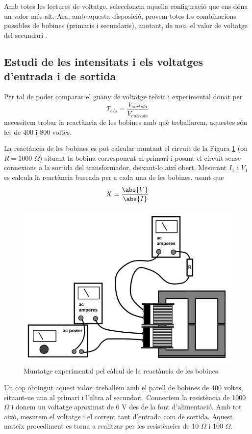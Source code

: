 \documentclass[a4paper,10.5pt]{report}
\begin{document}
Amb totes les lectures de voltatge, seleccionem aquella configuració que ens dóna un valor més alt. Ara, amb aquesta disposició, provem totes les combinacions possibles de bobines (primaris i secundaris), anotant, de nou, el valor de voltatge del secundari .

\subsection{Estudi de les intensitats i els voltatges d'entrada i de sortida}
Per tal de poder comparar el guany de voltatge teòric i experimental donat per
\begin{equation}
	T_{e/s}=\frac{V_{sortida}}{V_{entrada}}
	\label{eq4:25}
\end{equation}
necessitem trobar la reactància de les bobines amb què treballarem, aquestes són les de 400 i 800 voltes.

La reactància de les bobines es pot calcular muntant el circuit de la Figura \ref{fig4:4} (on $R=1000$ $\Omega$) situant la bobina corresponent al primari i posant el circuit sense connexions a la sortida del transformador, deixant-lo així obert. Mesurant $I_1$ i $V_1$ es calcula la reactància buscada per a cada una de les bobines, usant que
\begin{equation}
	X = \frac{\abs{V}}{\abs{I}}
	\label{eq4:27}
\end{equation}

\begin{figure}[h]
	\centering
	\includegraphics[width=0.4\linewidth]{screenshot010}
	\caption{Muntatge experimental pel càlcul de la reactància de les bobines.}
	\label{fig4:4}
\end{figure}

Un cop obtingut aquest valor, treballem amb el parell de bobines de 400 voltes, situant-ne una al primari i l'altra al secundari. Connectem la resistència de 1000 $\Omega$ i donem un voltatge aproximat de 6 V des de la font d'alimentació. Amb tot això, mesurem el voltatge i el corrent tant d'entrada com de sortida. Aquest mateix procediment es torna a realitzar per les resistències de 10 $\Omega$ i 100 $\Omega$.
\end{document}
